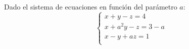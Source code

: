 \documentclass[addpoints,spanish, 12pt,a4paper]{exam}
\begin{document}
\begin{questions}

\question Dado el sistema de ecuaciones en función del parámetro $a$:$$\left\{ \begin{matrix}x + y - z = 4 \\ x + a^{2} y - z = 3 - a \\  x - y + a z = 1 \\ \end{matrix}\right.$$
\end{questions}
\end{document}
